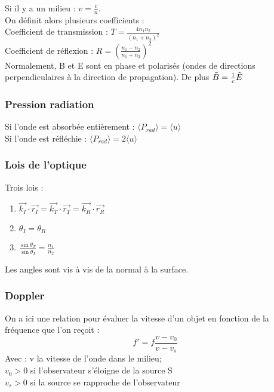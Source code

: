 \documentclass[../main.tex]{subfiles}
\begin{document}
Si il y a un milieu : $v = \frac{c}{n}$.\\

On définit alors plusieurs coefficients :\\
Coefficient de transmission : $T = \frac{4n_1n_2}{(n_1+n_2)^2}$\\
Coefficient de réflexion : $R = (\frac{n_1-n_2}{n_1+n_2})^2$\\

Normalement, B et E sont en phase et polarisés (ondes de directions perpendiculaires à la direction de propagation). De plus $\Tilde{B} = \frac{1}{c}\Tilde{E}$\\

\subsubsection{Pression radiation}
Si l'onde est absorbée entièrement : $\langle P_{rad}\rangle = \langle u\rangle$\\
Si l'onde est réfléchie : $\langle P_{rad}\rangle = 2\langle u\rangle $\\

\subsubsection{Lois de l'optique}
Trois lois :\\
\begin{enumerate}
    \item $\vec{k_I}\cdot \vec{r_I} = \vec{k_T}\cdot \vec{r_T} = \vec{k_R}\cdot \vec{r_R}$\\
    \item $\theta_I = \theta_R$\\
    \item $\frac{\sin{\theta_T}}{\sin{\theta_I}} = \frac{n_1}{n_2}$\\
\end{enumerate}
\warning Les angles sont vis à vis de la normal à la surface.\\

\subsubsection{Doppler}
On a ici une relation pour évaluer la vitesse d'un objet en fonction de la fréquence que l'on reçoit :\\
\begin{equation}
    f' = f\frac{v-v_0}{v-v_s}
\end{equation}
Avec : v la vitesse de l'onde dans le milieu;\\
$v_0 > 0$ si l'observateur s'éloigne de la source S\\
$v_s > 0$ si la source se rapproche de l'observateur \\
\end{document}
